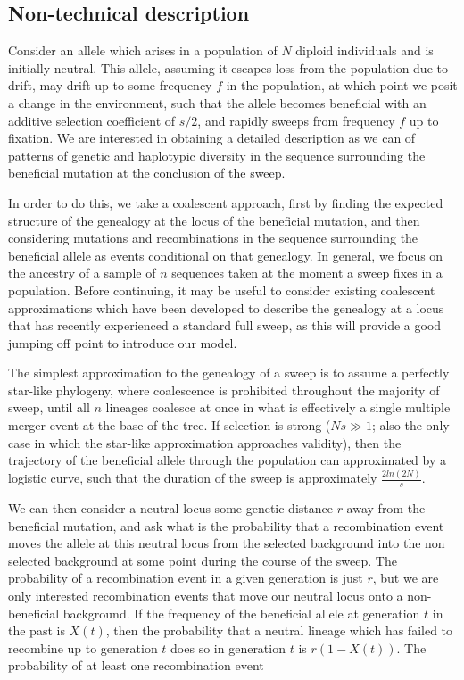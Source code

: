 \documentclass[a4paper,10pt]{article}
\begin{document}
\subsection{Non-technical description}
Consider an allele which arises in a population of $N$ diploid individuals and is initially neutral. This allele, assuming it escapes loss from the population due to drift, may drift up to some frequency $f$ in the population, at which point we posit a change in the environment, such that the allele becomes beneficial with an additive selection coefficient of $s/2$, and rapidly sweeps from frequency $f$ up to fixation. We are interested in obtaining a detailed description as we can of patterns of genetic and haplotypic diversity in the sequence surrounding the beneficial mutation at the conclusion of the sweep.

In order to do this, we take a coalescent approach, first by finding the expected structure of the genealogy at the locus of the beneficial mutation, and then considering mutations and recombinations in the sequence surrounding the beneficial allele as events conditional on that genealogy. In general, we focus on the ancestry of a sample of $n$ sequences taken at the moment a sweep fixes in a population. Before continuing, it may be useful to consider existing coalescent approximations which have been developed to describe the genealogy at a locus that has recently experienced a standard full sweep, as this will provide a good jumping off point to introduce our model. 

The simplest approximation to the genealogy of a sweep is to assume a perfectly star-like phylogeny, where coalescence is prohibited throughout the majority of sweep, until all $n$ lineages coalesce at once in what is effectively a single multiple merger event at the base of the tree. If selection is strong ($Ns \gg 1$; also the only case in which the star-like approximation approaches validity), then the trajectory of the beneficial allele through the population can approximated by a logistic curve, such that the duration of the sweep is approximately $\frac{2 ln\left(2N\right)}{s}$. 

We can then consider a neutral locus some genetic distance $r$ away from the beneficial mutation, and ask what is the probability that a recombination event moves the allele at this neutral locus from the selected background into the non selected background at some point during the course of the sweep. The probability of a recombination event in a given generation is just $r$, but we are only interested recombination events that move our neutral locus onto a non-beneficial background. If the frequency of the beneficial allele at generation $t$ in the past is $X\left(t\right)$, then the probability that a neutral lineage which has failed to recombine up to generation $t$ does so in generation $t$ is $r\left(1-X\left(t\right)\right)$. The probability of at least one recombination event 
\end{document}
